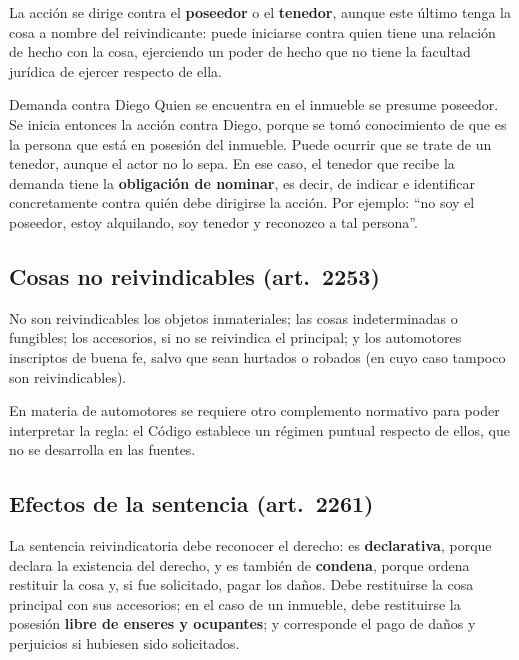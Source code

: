 \documentclass[12pt,oneside]{book}
\begin{document}
La acción se dirige contra el \textbf{poseedor} o el \textbf{tenedor}, aunque este último tenga la cosa a nombre del reivindicante: puede iniciarse contra quien tiene una relación de hecho con la cosa, ejerciendo un poder de hecho que no tiene la facultad jurídica de ejercer respecto de ella.

\begin{example}{Demanda contra Diego}
Quien se encuentra en el inmueble se presume poseedor. Se inicia entonces la acción contra Diego, porque se tomó conocimiento de que es la persona que está en posesión del inmueble. Puede ocurrir que se trate de un tenedor, aunque el actor no lo sepa. En ese caso, el tenedor que recibe la demanda tiene la \textbf{obligación de nominar}, es decir, de indicar e identificar concretamente contra quién debe dirigirse la acción. Por ejemplo: ``no soy el poseedor, estoy alquilando, soy tenedor y reconozco a tal persona''.
\end{example}

\subsection{Cosas no reivindicables (art.~2253)}

No son reivindicables los objetos inmateriales; las cosas indeterminadas o fungibles; los accesorios, si no se reivindica el principal; y los automotores inscriptos de buena fe, salvo que sean hurtados o robados (en cuyo caso tampoco son reivindicables).

\begin{note}
En materia de automotores se requiere otro complemento normativo para poder interpretar la regla: el Código establece un régimen puntual respecto de ellos, que no se desarrolla en las fuentes.
\end{note}

\subsection{Efectos de la sentencia (art.~2261)}

La sentencia reivindicatoria debe reconocer el derecho: es \textbf{declarativa}, porque declara la existencia del derecho, y es también de \textbf{condena}, porque ordena restituir la cosa y, si fue solicitado, pagar los daños. Debe restituirse la cosa principal con sus accesorios; en el caso de un inmueble, debe restituirse la posesión \textbf{libre de enseres y ocupantes}; y corresponde el pago de daños y perjuicios si hubiesen sido solicitados.
\end{document}
